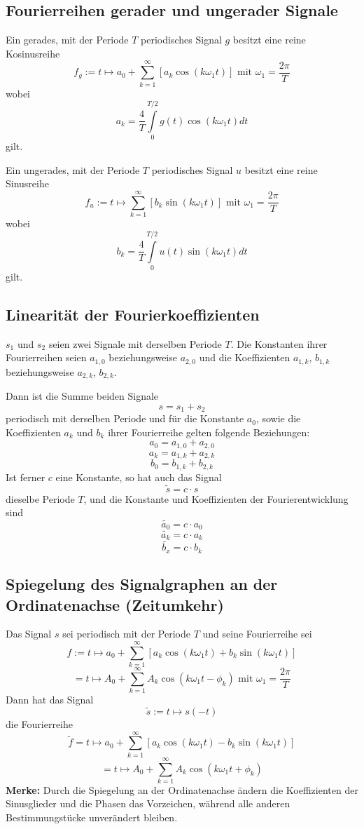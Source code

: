 \documentclass[10pt,a4paper]{scrartcl}
\begin{document}
\subsection{Fourierreihen gerader und ungerader Signale}

Ein gerades, mit der Periode $T$ periodisches Signal $g$ besitzt eine reine
Kosinusreihe
$$f_g := t \mapsto a_0 + \sum_{k=1}^{\infty} \left[ a_k \cos(k\omega_1t)\right]
    \textrm{ mit } \omega_1 = \frac{2\pi}{T}$$
wobei
$$a_k = \frac{4}{T} \int\limits_0^{T/2} g(t) \cos(k\omega_1t) dt$$
gilt.

Ein ungerades, mit der Periode $T$ periodisches Signal $u$ besitzt eine reine
Sinusreihe
$$f_u := t \mapsto \sum_{k=1}^{\infty} \left[ b_k \sin(k\omega_1t)\right]
    \textrm{ mit } \omega_1 = \frac{2\pi}{T}$$
wobei
$$b_k = \frac{4}{T} \int\limits_0^{T/2} u(t) \sin(k\omega_1t) dt$$
gilt.


\subsection{Linearität der Fourierkoeffizienten}

$s_1$ und $s_2$ seien zwei Signale mit derselben Periode $T$. Die Konstanten
ihrer Fourierreihen seien $a_{1,0}$ beziehungsweise $a_{2,0}$ und die
Koeffizienten $a_{1,k}$, $b_{1,k}$ beziehungsweise $a_{2,k}$, $b_{2,k}$.

Dann ist die Summe beiden Signale
$$s = s_1 + s_2$$
periodisch mit derselben Periode und für die Konstante $a_0$, sowie die
Koeffizienten $a_k$ und $b_k$ ihrer Fourierreihe gelten folgende Beziehungen:
$$a_0 = a_{1,0} + a_{2,0}$$
$$a_k = a_{1,k} + a_{2,k}$$
$$b_0 = b_{1,k} + b_{2,k}$$
Ist ferner $c$ eine Konstante, so hat auch das Signal
$$\tilde{s} = c \cdot s$$
dieselbe Periode $T$, und die Konstante und Koeffizienten der
Fourierentwicklung sind
$$\tilde{a_0} = c \cdot a_0$$
$$\tilde{a_k} = c \cdot a_k$$
$$\tilde{b_x} = c \cdot b_k$$


\subsection{Spiegelung des Signalgraphen an der Ordinatenachse (Zeitumkehr)}

Das Signal $s$ sei periodisch mit der Periode $T$ und seine Fourierreihe sei
$$f:= t \mapsto a_0 + \sum_{k=1}^{\infty} \left[a_k\cos(k\omega_1t)
    + b_k\sin(k\omega_1t)\right]$$
$$= t \mapsto A_0 + \sum_{k=1}^{\infty} A_k \cos(k\omega_1t - \phi_k)
    \textrm{ mit } \omega_1 = \frac{2\pi}{T}$$
Dann hat das Signal
$$\tilde{s} := t \mapsto s(-t)$$
die Fourierreihe
$$\tilde{f} = t \mapsto a_0 + \sum_{k=1}^{\infty} \left[a_k \cos(k\omega_1t)
    - b_k\sin(k\omega_1t)\right]$$
$$= t \mapsto A_0 + \sum_{k=1}^{\infty} A_k\cos(k\omega_1t + \phi_k)$$
\textbf{Merke:} Durch die Spiegelung an der Ordinatenachse ändern die
Koeffizienten der Sinusglieder und die Phasen das Vorzeichen, während alle
anderen Bestimmungstücke unverändert bleiben.
\end{document}
